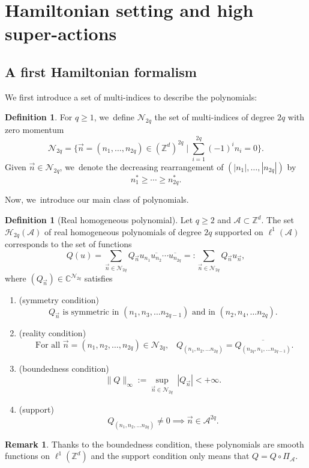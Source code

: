 \documentclass[10pt]{amsart}
\let\ts\textstyle
\theoremstyle{plain}
\theoremstyle{definition}
\newtheorem{definition}[theorem]{Definition}
\newtheorem{remark}[theorem]{Remark}
\newcommand{\Z}{\mathbb{Z}}
\newcommand{\C}{\mathbb{C}}
\newcommand{\1}{\mathbf{1}}
\begin{document}
\section{Hamiltonian setting and high super-actions}
\subsection{A first Hamiltonian formalism} We first introduce a set of multi-indices to describe the polynomials:
\begin{definition}
\label{def:multi}
For $q\geq1$, we~define $\mathcal{N}_{2q}$ the set of multi-indices of degree $2q$ with zero momentum
\[
\ts
\mathcal{N}_{2q} = \big\{ \vec{n} = (n_{1},\dots,n_{2q})\in (\Z^d)^{2q}\mid \sum_{i=1}^{2q}(-1)^{i}n_{i}=0\big\}.
\]
Given $\vec{n}\in\mathcal{N}_{2q}$, we~denote the decreasing rearrangement of $(|n_{1}|,\dots,|n_{2q}|)$ by
\[
n_{1}^{\ast}\geq \cdots \geq n_{2q}^{\ast}.
\]
\end{definition}
Now, we~introduce our main class of polynomials.
\begin{definition}[Real homogeneous polynomial]
\label{def:hamb} Let $q\geq 2$ and $\mathcal{A} \subset \mathbb{Z}^d$. The set $\mathcal{H}_{2q}(\mathcal{A})$ of real homogeneous polynomials of degree $2q$ supported on $ \ell^1(\mathcal{A})$ corresponds to the set of functions
\[
Q(u) = \sum_{\vec{n}\in\mathcal{N}_{2q}} Q_{\vec{n}}u_{n_{1}}\overline{u_{n_{2}}}\cdots \overline{u_{n_{2q}}}=:\sum_{\vec{n}\in\mathcal{N}_{2q}}Q_{\vec{n}}u_{\vec{n}},
\]
where $(Q_{\vec{n}})\in\C^{\mathcal{N}_{2q}}$ satisfies
\begin{enumerate}
\item
(symmetry condition)
\[
\text{$Q_{\vec{n}}$ is symmetric in $(n_{1},n_{3},\dots n_{2q-1})$ and in $(n_{2},n_{4},\dots n_{2q})$.}
\]

\item
(reality condition)
\[
\text{ For all $\vec{n}=(n_{1},n_{2},\dots,n_{2q})\in\mathcal{N}_{2q}$,}\quad Q_{(n_{1},n_{2},\dots n_{2q})} = \overline{Q_{(n_{2q},n_{1},\dots n_{2q-1})}}.
\]

\item
(boundedness condition)
\[
\|Q\|_{\infty} := \underset{\vec{n}\in\mathcal{N}_{2q}}{\sup}\ |Q_{\vec{n}}| <+\infty.
\]

\item
(support)
\[
Q_{(n_{1},n_{2},\dots n_{2q})} \neq 0 \implies \vec{n} \in \mathcal{A}^{2q}.
\]
\end{enumerate}
\end{definition}
\begin{remark}
Thanks to the boundedness condition, these polynomials are smooth functions on $\ell^1(\mathbb{Z}^d)$ and the support condition only means that $Q = Q\circ \Pi_{\mathcal{A}}$.
\end{remark}
\end{document}
